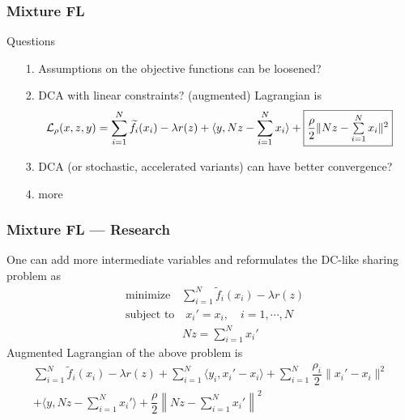 \begin{frame}
\frametitle{Mixture FL}

\begin{block}{Questions}
\begin{itemize}
    \item[1.] Assumptions on the objective functions can be loosened?
    \item[2.] DCA with linear constraints? (augmented) Lagrangian is
    {\scriptsize
    $$\mathcal{L}_{\rho}(x,z,y) = \sum\limits_{i=1}^N \widetilde{f}_i(x_i) - \lambda r(z) + \langle y, Nz - \sum\limits_{i=1}^N x_i \rangle + \framebox{$\dfrac{\rho}{2} \lVert Nz - \sum\limits_{i=1}^N x_i \rVert^2$} $$
    }
    \item[3.] DCA (or stochastic, accelerated variants) can have better convergence?
    \item[4.] more
\end{itemize}
\end{block}

\end{frame}


\begin{frame}
\frametitle{Mixture FL --- Research}

One can add more intermediate variables and reformulates the DC-like sharing problem as
\begin{align*}
    & \text{minimize} \quad \sum\limits_{i=1}^N \widetilde{f}_i(x_i) - \lambda r(z) \\
    & \text{subject to} \quad x_i' = x_i, \quad i=1,\cdots,N \\
    & \phantom{subject to} \quad Nz = \sum\limits_{i=1}^N x_i'
\end{align*}
Augmented Lagrangian of the above problem is
{\footnotesize
\begin{multline*}
    \sum\limits_{i=1}^N \widetilde{f}_i(x_i) - \lambda r(z) + \sum\limits_{i=1}^N \langle y_i, x_i'-x_i\rangle + \sum\limits_{i=1}^N \dfrac{\rho_i}{2} \lVert x_i'-x_i \rVert^2 \\
    + \langle y, Nz-\sum\limits_{i=1}^N x_i'\rangle + \dfrac{\rho}{2} \left\lVert Nz-\sum\limits_{i=1}^N x_i' \right\rVert^2
\end{multline*}
}

\end{frame}


